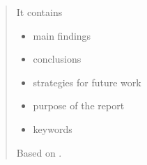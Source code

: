 \begin{abstract}
    It contains
    \begin{itemize}
        \item main findings
        \item conclusions
        \item strategies for future work
        \item purpose of the report
        \item keywords
    \end{itemize}
    Based on \cite{AssignmentExpert2026}.
\end{abstract}